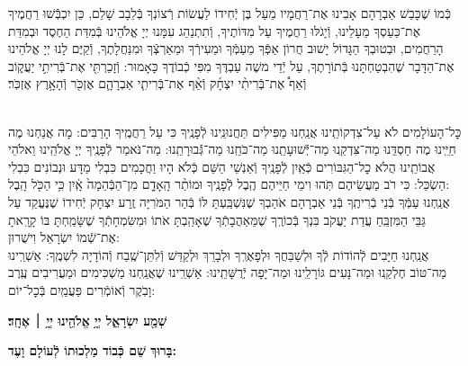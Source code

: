 \documentclass[twoside, openany, parskip=half, 11pt]{book}
\begin{document}
כְּֿמוֹ שֶׁכָּבַשׁ אַבְרָהָם אָבִינוּ אֶת־רַחֲמָיו מֵעַל בֶּן יְֿחִידוֹ לַעֲשׂוֹת רְֿצוֹנְךָ בְּֿלֵבָב שָׁלֵם, כֵּן יִכְבְּֿֿשׁוּ רַחֲמֶיךָ אֶת־כַּעַסְךָ מֵעָלֵינוּ, וְֿיָגֹלּוּ רַחֲמֶיךָ עַל מִדּוֹתֶיךָ, וְֿתִתְנַהֵג עִמָּנוּ יְיָ אֱלֹהֵינוּ בְּֿמִדַּת הַחֶסֶד וּבְמִדַּת הָרַחֲמִים, וּבְטוּבְךָ הַגָּדוֹל יָשׁוּב חֲרוֹן אַפְּֿךָ מֵעַמְּֿךָ וּמֵעִירְֿךָ וּמֵאַרְצְֿךָ וּמִנַּחֲלָתֶךָ, וְֿקַיֶּם לָנוּ יְיָ אֱלֹהֵינוּ אֶת־הַדָּבָר שֶׁהִבְטַחְתָּנוּ בְּֿתוֹרָתֶךָ, עַל יְֿדֵי משֶׁה עַבְדֶּךָ מִפִּי כְֿבוֹדֶךָ כָּאָמוּר: 
וְֿזָכַרְתִּ֖י אֶת־בְּֿרִיתִ֣י יַעֲק֑וֹב וְֿאַף֩ אֶת־בְּֿרִיתִ֨י יִצְחָ֜ק וְֿאַ֨ף אֶת־בְּֿרִיתִ֧י אַבְרָהָ֛ם אֶזְכֹּ֖ר וְֿהָאָ֥רֶץ אֶזְכֹּֽר׃\\
\\

כׇּל־הָעוֹלָמִים לֹא עַל־צִדְקוֹתֵֽינוּ אֲנַֽחְנוּ מַפִּילִים תַּחֲנוּנֵֽינוּ לְֿפָנֶֽיךָ כִּי עַל רַחֲמֶֽיךָ הָרַבִּים: מָה אֲנַחְנוּ מֶה חַיֵּֽינוּ מֶה חַסְדֵּֽנוּ מַה־צִּדְקֵֽנוּ מַה־יְּֿֿשׁוּעָתֵֽנוּ מַה־כֹּחֵֽנוּ מַה־גְּֿֿבוּרָתֵֽנוּ: מַה־נֹּאמַר לְֿפָנֶֽיךָ יְיָ אֱלֹהֵֽינוּ וֵאלֹהֵי אֲבוֹתֵֽינוּ הֲלֹא כׇל־הַגִּבּוֹרִים כְּֿאַֽיִן לְֿפָנֶֽיךָ וְֿאַנְשֵׁי הַשֵּׁם כְּֿלֹא הָיוּ וַחֲכָמִים כִּבְלִי מַדָּע וּנְבוֹנִים כִּבְלִי הַשְׂכֵּל: כִּי רֹב מַעֲשֵׂיהֶם תֹּֽהוּ וִימֵי חַיֵּיהֶם הֶֽבֶל לְֿפָנֶֽיךָ 
וּמוֹתַ֨ר הָֽאָדָ֤ם מִן־הַבְּֿהֵמָה֙ אָֽ֔יִן כִּ֥י הַכֹּ֖ל הָֽבֶל: \\
אֲנַֽחְנוּ עַמְּֿךָ בְּֿנֵי בְֿרִיתֶֽךָ בְּֿנֵי אַבְרָהָם אֹהַבְךָ שֶׁנִּשְׁבַּֽעְתָּ לּוֹ בְּֿהַר הַמֹּרִיָּה זֶֽרַע יִצְחָק יְֿחִידוֹ שֶׁנֶּעֱקַד עַל גַּבֵּי הַמִּזְבֵּֽחַ עֲדַת יַעֲקֹב בִּנְךָ בְּֿכוֹרֶֽךָ שֶׁמֵּאַהֲבָתְֿךָ שֶׁאָהַֽבְתָּ אֹתוֹ וּמִשִּׂמְחָתְֿךָ שֶׁשָּׂמַֽחְתָּ בּוֹ קָרָֽאתָ אֶת־שְֿׁמוֹ יִשְׂרָאֵל וִישֻׁרוּן: \\
אֲנַֽחְנוּ חַיָּבִים לְֿהוֹדוֹת לְֿךָ וּלְשַׁבֵּחֲךָ וּלְפָאֶרְֽךָ וּלְבָרֵךְ וּלְקַדֵּשׁ וְֿלִתֵּן־שֶֽׁבַח וְֿהוֹדָיָה לִשְׁמֶֽךָ: אַשְׁרֵֽינוּ מַה־טּוֹב חֶלְקֵֽנוּ וּמַה־נָּעִים גּוֹרָלֵֽינוּ וּמַה־יָּפָה יְֿרֻשָּׁתֵֽינוּ: אַשְׁרֵֽינוּ שֶׁאֲנַֽחְנוּ מַשְׁכִּימִים וּמַעֲרִיבִים עֶֽרֶב וָבֹֽקֶר וְֿאוֹמְֿרִים פַּעֲמַֽיִם בְּֿכׇל־יוֹם:

\begin{Large}
\textbf{שְׁמַ֖ע יִשְׂרָאֵ֑ל יְיָ֥ אֱלֹהֵ֖ינוּ יְיָ֥ ׀ אֶחָֽד׃}
\end{Large}

\textbf{%
בָּרוּךְ שֵׁם כְּֿבוֹד מַלְכוּתוֹ לְֿעוֹלָם וָעֶד:
}
\end{document}
